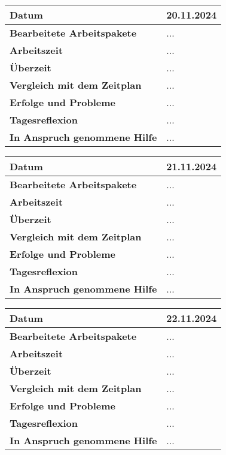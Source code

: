\begin{longtable}{p{}|p{}}
	\hline
	\textbf{Datum}                       & 20.11.2024            \\
	\hline
	\textbf{Bearbeitete Arbeitspakete}   & ...                  \\
	\hline
	\textbf{Arbeitszeit}                 & ...                                    \\
	\hline
	\textbf{Überzeit}                    & ...                                    \\
	\hline
	\textbf{Vergleich mit dem Zeitplan}  & ... \\
	\hline
	\textbf{Erfolge und Probleme} & ...
	\\
	\hline
	\textbf{Tagesreflexion} & ...
	\\
	\hline
	\textbf{In Anspruch genommene Hilfe} & ...                              \\
	\hline
\end{longtable}\label{tab:arbeitsprotokoll-20.11.2024}
\newpage

\begin{longtable}{p{}|p{}}
	\hline
	\textbf{Datum}                       & 21.11.2024            \\
	\hline
	\textbf{Bearbeitete Arbeitspakete}   & ...                  \\
	\hline
	\textbf{Arbeitszeit}                 & ...                                    \\
	\hline
	\textbf{Überzeit}                    & ...                                    \\
	\hline
	\textbf{Vergleich mit dem Zeitplan}  & ... \\
	\hline
	\textbf{Erfolge und Probleme} & ...
	\\
	\hline
	\textbf{Tagesreflexion} & ...
	\\
	\hline
	\textbf{In Anspruch genommene Hilfe} & ...                              \\
	\hline
\end{longtable}\label{tab:arbeitsprotokoll-21.11.2024}
\newpage

\begin{longtable}{p{}|p{}}
	\hline
	\textbf{Datum}                       & 22.11.2024            \\
	\hline
	\textbf{Bearbeitete Arbeitspakete}   & ...                  \\
	\hline
	\textbf{Arbeitszeit}                 & ...                                    \\
	\hline
	\textbf{Überzeit}                    & ...                                    \\
	\hline
	\textbf{Vergleich mit dem Zeitplan}  & ... \\
	\hline
	\textbf{Erfolge und Probleme} & ...
	\\
	\hline
	\textbf{Tagesreflexion} & ...
	\\
	\hline
	\textbf{In Anspruch genommene Hilfe} & ...                              \\
	\hline
\end{longtable}\label{tab:arbeitsprotokoll-22.11.2024}
\newpage
